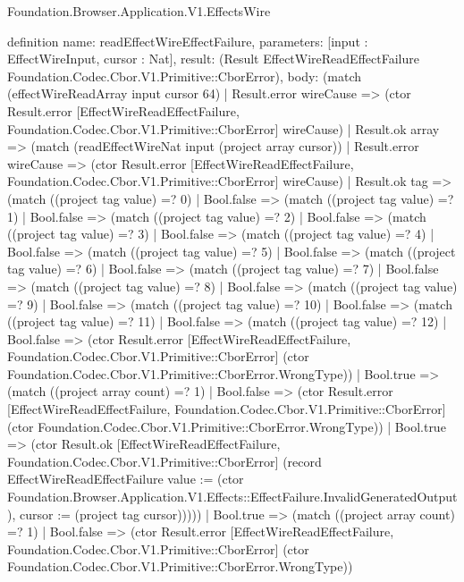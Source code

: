 \begin{lexlean}{Foundation.Browser.Application.V1.EffectsWire}
\begin{semanticmodule}
definition{
  name: readEffectWireEffectFailure,
  parameters: [input : EffectWireInput, cursor : Nat],
  result: (Result EffectWireReadEffectFailure Foundation.Codec.Cbor.V1.Primitive::CborError),
  body: (match (effectWireReadArray input cursor 64)
    | Result.error wireCause => (ctor Result.error [EffectWireReadEffectFailure, Foundation.Codec.Cbor.V1.Primitive::CborError] wireCause)
    | Result.ok array => (match (readEffectWireNat input (project array cursor))
      | Result.error wireCause => (ctor Result.error [EffectWireReadEffectFailure, Foundation.Codec.Cbor.V1.Primitive::CborError] wireCause)
      | Result.ok tag => (match ((project tag value) =? 0)
        | Bool.false => (match ((project tag value) =? 1)
          | Bool.false => (match ((project tag value) =? 2)
            | Bool.false => (match ((project tag value) =? 3)
              | Bool.false => (match ((project tag value) =? 4)
                | Bool.false => (match ((project tag value) =? 5)
                  | Bool.false => (match ((project tag value) =? 6)
                    | Bool.false => (match ((project tag value) =? 7)
                      | Bool.false => (match ((project tag value) =? 8)
                        | Bool.false => (match ((project tag value) =? 9)
                          | Bool.false => (match ((project tag value) =? 10)
                            | Bool.false => (match ((project tag value) =? 11)
                              | Bool.false => (match ((project tag value) =? 12)
                                | Bool.false => (ctor Result.error [EffectWireReadEffectFailure, Foundation.Codec.Cbor.V1.Primitive::CborError] (ctor Foundation.Codec.Cbor.V1.Primitive::CborError.WrongType))
                                | Bool.true => (match ((project array count) =? 1)
                                  | Bool.false => (ctor Result.error [EffectWireReadEffectFailure, Foundation.Codec.Cbor.V1.Primitive::CborError] (ctor Foundation.Codec.Cbor.V1.Primitive::CborError.WrongType))
                                  | Bool.true => (ctor Result.ok [EffectWireReadEffectFailure, Foundation.Codec.Cbor.V1.Primitive::CborError] (record EffectWireReadEffectFailure {value := (ctor Foundation.Browser.Application.V1.Effects::EffectFailure.InvalidGeneratedOutput), cursor := (project tag cursor)}))))
                              | Bool.true => (match ((project array count) =? 1)
                                | Bool.false => (ctor Result.error [EffectWireReadEffectFailure, Foundation.Codec.Cbor.V1.Primitive::CborError] (ctor Foundation.Codec.Cbor.V1.Primitive::CborError.WrongType))
}
\end{semanticmodule}
\end{lexlean}

